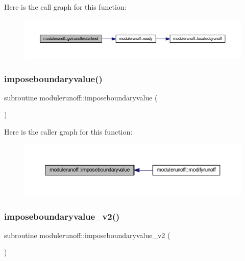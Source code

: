 Here is the call graph for this function\+:
\nopagebreak
\begin{figure}[H]
\begin{center}
\leavevmode
\includegraphics[width=350pt]{namespacemodulerunoff_a739d861fb3d51996841a644f1567506e_cgraph}
\end{center}
\end{figure}
\mbox{\label{namespacemodulerunoff_a994fa95e6648fa412fa3e0982c2953e3}} 
\subsubsection{\texorpdfstring{imposeboundaryvalue()}{imposeboundaryvalue()}}
{\footnotesize\ttfamily subroutine modulerunoff\+::imposeboundaryvalue (\begin{DoxyParamCaption}{ }\end{DoxyParamCaption})\hspace{0.3cm}{\ttfamily [private]}}

Here is the caller graph for this function\+:
\nopagebreak
\begin{figure}[H]
\begin{center}
\leavevmode
\includegraphics[width=350pt]{namespacemodulerunoff_a994fa95e6648fa412fa3e0982c2953e3_icgraph}
\end{center}
\end{figure}
\mbox{\label{namespacemodulerunoff_acf9771f898b15e849b1eaba077dd0d83}} 
\subsubsection{\texorpdfstring{imposeboundaryvalue\+\_\+v2()}{imposeboundaryvalue\_v2()}}
{\footnotesize\ttfamily subroutine modulerunoff\+::imposeboundaryvalue\+\_\+v2 (\begin{DoxyParamCaption}{ }\end{DoxyParamCaption})\hspace{0.3cm}{\ttfamily [private]}}

